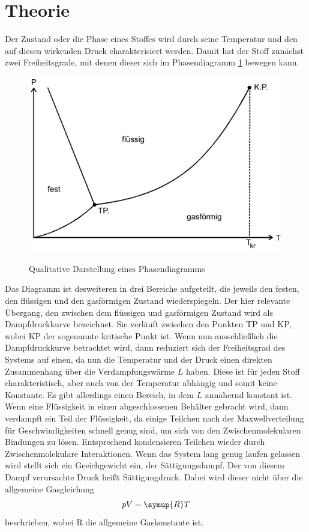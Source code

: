 \section{Theorie}
\label{sec:Theorie}
Der Zustand oder die Phase eines Stoffes wird durch seine Temperatur und den auf diesen wirkenden Druck charakterisiert werden.
Damit hat der Stoff zunächst zwei Freiheitsgrade, mit denen dieser sich im Phasendiagramm \ref{fig:phasendiagramm} bewegen kann.
\begin{figure}[H]
    \centering
    \caption{Qualitative Darstellung eines Phasendiagramms}
    \includegraphics[width=\textwidth]{Bilder/Phasendiagramm.png}%
    \label{fig:phasendiagramm}
\end{figure}
\noindent Das Diagramm ist desweiteren in drei Bereiche aufgeteilt, die jeweils den festen, den flüssigen und den gasförmigen Zustand wiederspiegeln.
Der hier relevante Übergang, den zwischen dem flüssigen und gasförmigen Zustand wird als Dampfdruckkurve bezeichnet.
Sie verläuft zwischen den Punkten TP und KP, wobei KP der sogenannte kritische Punkt ist. Wenn nun ausschließlich die 
Dampfdruckkurve betrachtet wird, dann reduziert sich der Freiheitsgrad des Systems auf einen, da nun die Temperatur und der
Druck einen direkten Zusammenhang über die Verdampfungswärme $L$ haben. Diese ist für jeden Stoff charakteristisch, aber auch 
von der Temperatur abhängig und somit keine Konstante. Es gibt allerdings einen Bereich, in dem $L$ annähernd konstant ist.\\

\noindent Wenn eine Flüssigkeit in einen abgeschlossenen Behälter gebracht wird, dann verdampft ein Teil der Flüssigkeit, da einige Teilchen
nach der Maxwellverteilung für Geschwindigkeiten schnell genug sind, um sich von den Zwischenmolekularen Bindungen zu lösen. 
Entsprechend kondensieren Teilchen wieder durch Zwischenmolekulare Interaktionen. Wenn das System lang genug laufen gelassen
wird stellt sich ein Geeichgewicht ein, der Sättigungsdampf. Der von diesem Dampf verursachte Druck heißt Sättigungdruck.
Dabei wird dieser nicht über die allgemeine Gasgleichung
\begin{equation}
    pV=\symup{R}T
    \label{eqn:gas}
\end{equation}
beschrieben, wobei R die allgemeine Gaskonstante ist.\\

